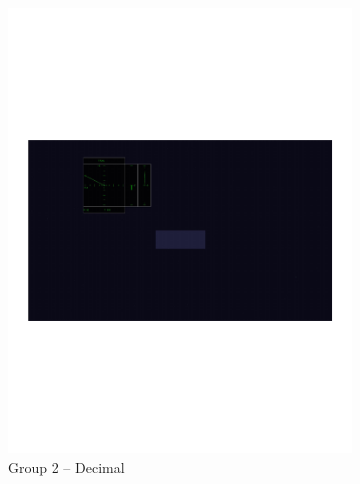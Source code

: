 \documentclass[]{aiaa-tc}%
\begin{document}
\begin{figure}[tb!]
\begin{subfigure}{.5\textwidth}
    \includegraphics[width=.99\linewidth, page=2]{figs/guidance_full.pdf}
    \caption{Group 2 -- Decimal}
    \label{fig:sub2}
  \end{subfigure}\vspace{1em}
  \begin{subfigure}{.5\textwidth}
    \centering

\end{subfigure}
\end{figure}
\end{document}
